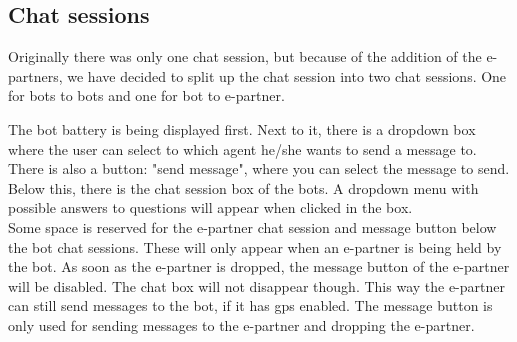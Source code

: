 \documentclass{article}
\begin{document}
\subsection{Chat sessions}
Originally there was only one chat session, but because of the addition of the e-partners, we have decided to split up the chat session into two chat sessions. One for bots to bots and one for bot to e-partner.

The bot battery is being displayed first. Next to it, there is a dropdown box where the user can select to which agent he/she wants to send a message to. There is also a button: "send message", where you can select the message to send. Below this, there is the chat session box of the bots. A dropdown menu with possible answers to questions will appear when clicked in the box. \\

Some space is reserved for the e-partner chat session and message button below the bot chat sessions. These will only appear when an e-partner is being held by the bot. As soon as the e-partner is dropped, the message button of the e-partner will be disabled. The chat box will not disappear though. This way the e-partner can still send messages to the bot, if it has gps enabled. The message button is only used for sending messages to the e-partner and dropping the e-partner.
\end{document}
